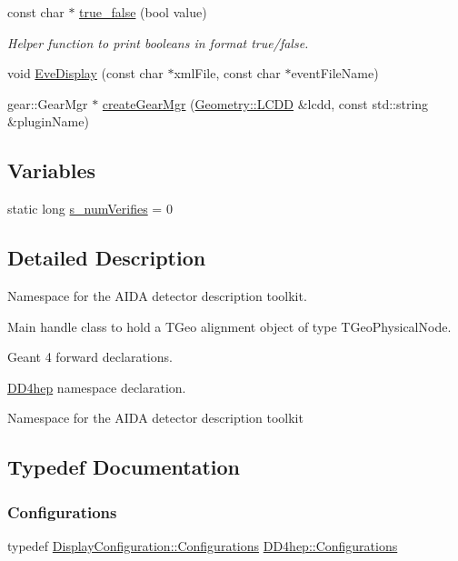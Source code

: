 \begin{DoxyCompactItemize}
const char $\ast$ \hyperlink{namespace_d_d4hep_a32a48a8889b636138d95a06c5818a858}{true\+\_\+false} (bool value)
\begin{DoxyCompactList}\small\item\em Helper function to print booleans in format true/false. \end{DoxyCompactList}\item 
void \hyperlink{namespace_d_d4hep_abf73c406aa34c4fe6bd8af3985bdd888}{Eve\+Display} (const char $\ast$xml\+File, const char $\ast$event\+File\+Name)
\item 
gear\+::\+Gear\+Mgr $\ast$ \hyperlink{namespace_d_d4hep_aeaa49904e5fff3d47fa8fd9600655f3e}{create\+Gear\+Mgr} (\hyperlink{class_d_d4hep_1_1_geometry_1_1_l_c_d_d}{Geometry\+::\+L\+C\+DD} \&lcdd, const std\+::string \&plugin\+Name)
\end{DoxyCompactItemize}
\subsection*{Variables}
\begin{DoxyCompactItemize}
\item 
static long \hyperlink{namespace_d_d4hep_afc2f0d9d3dc77e8a9b1a06b7cd0404f0}{s\+\_\+num\+Verifies} = 0
\end{DoxyCompactItemize}


\subsection{Detailed Description}
Namespace for the A\+I\+DA detector description toolkit. 

Main handle class to hold a T\+Geo alignment object of type T\+Geo\+Physical\+Node.

Geant 4 forward declarations.

\hyperlink{namespace_d_d4hep}{D\+D4hep} namespace declaration.

Namespace for the A\+I\+DA detector description toolkit 

\subsection{Typedef Documentation}
\hypertarget{namespace_d_d4hep_a88b4bb8cba5bc194ed6da21bbb2e4787}{}\label{namespace_d_d4hep_a88b4bb8cba5bc194ed6da21bbb2e4787} 
\subsubsection{\texorpdfstring{Configurations}{Configurations}}
{\footnotesize\ttfamily typedef \hyperlink{class_d_d4hep_1_1_display_configuration_ac43586ae2c70f106cc9027d452d383d7}{Display\+Configuration\+::\+Configurations} \hyperlink{namespace_d_d4hep_a88b4bb8cba5bc194ed6da21bbb2e4787}{D\+D4hep\+::\+Configurations}}



